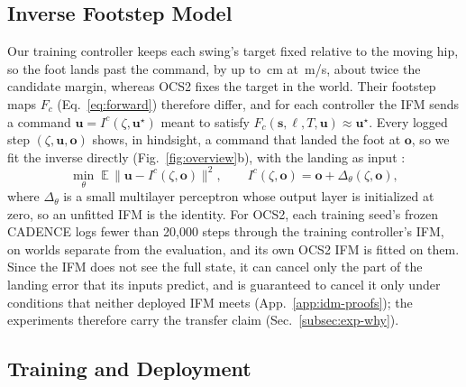 \subsection{Inverse Footstep Model}
\label{subsec:method-idm}

 Our training controller keeps each swing's target fixed
relative to the moving hip, so the foot lands past the command, by up to
\corlOvershootFastMax\,cm at \corlSimSpeedFast\,m/s, about twice the
candidate margin, whereas OCS2 fixes the target in the world. Their footstep
maps $F_c$ (Eq.~\eqref{eq:forward}) therefore differ, and for each
controller the IFM sends a command $\mathbf u = I^c(\zeta,\mathbf
u^\star)$ meant to satisfy $F_c(\mathbf s,\ell,T,\mathbf u) \approx
\mathbf u^\star$. Every logged step $(\zeta,\mathbf u,\mathbf o)$ shows,
in hindsight, a command that landed the foot at $\mathbf o$, so we fit
the inverse directly (Fig.~\ref{fig:overview}b), with the landing as input
\citep{jordan_forward_1992, andrychowicz_hindsight_2017,
akizhanov_learning_2024}:
\begin{equation}
  \min_\theta \; \mathbb E\,
  \big\| \mathbf u - I^c(\zeta, \mathbf o) \big\|^2,
  \qquad
  I^c(\zeta, \mathbf o) = \mathbf o + \Delta_\theta(\zeta, \mathbf o),
  \label{eq:idm-loss}
\end{equation}
where $\Delta_\theta$ is a small multilayer perceptron whose output
layer is initialized at zero, so an unfitted IFM is the identity. For
OCS2, each training seed's frozen CADENCE logs
fewer than 20{,}000 steps through the training controller's IFM, on
worlds separate from the evaluation, and its own OCS2 IFM is fitted on
them.
\label{subsec:idm-theory}Since the IFM does not see the
full state, it can cancel only the part of the landing error that its
inputs predict, and is guaranteed to cancel it only under conditions
that neither deployed IFM meets (App.~\ref{app:idm-proofs}); the
experiments therefore carry the transfer claim
(Sec.~\ref{subsec:exp-why}).

\subsection{Training and Deployment}
\label{subsec:method-training}

